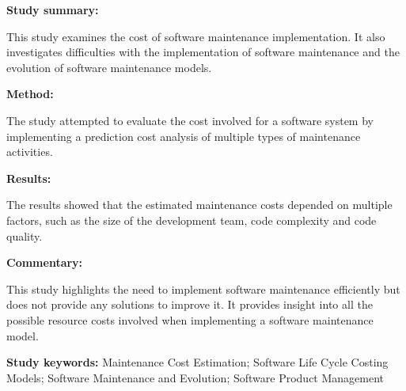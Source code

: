 \begin{tcolorbox}[colback=gray!5!white, colframe=pastelgreen!40!black, title=A cost model for software maintenance \& evolution\cite{Sneed2004}]
	\begin{minipage}[t]{0.25\textwidth}
		\textbf{Study summary:}
	\end{minipage}
	\hfill
	\begin{minipage}[t]{0.65\textwidth}
		This study examines the cost of software maintenance implementation. It also investigates difficulties with the implementation of software maintenance and the evolution of software maintenance models. 
	\end{minipage}

	\vspace{0.75em} 

	\begin{minipage}[t]{0.25\textwidth}
		\textbf{Method:}
	\end{minipage}
	\hfill
	\begin{minipage}[t]{0.65\textwidth}
		The study attempted to evaluate the cost involved for a software system by implementing a prediction cost analysis of multiple types of maintenance activities.
	\end{minipage}

	\vspace{0.75em} 

	\begin{minipage}[t]{0.25\textwidth}
		\textbf{Results:}
	\end{minipage}
	\hfill
	\begin{minipage}[t]{0.65\textwidth}
		The results showed that the estimated maintenance costs depended on multiple factors, such as the size of the development team, code complexity and code quality.
	\end{minipage}

	\vspace{0.75em} 

	\begin{minipage}[t]{0.25\textwidth}
		\textbf{Commentary:}
	\end{minipage}
	\hfill
	\begin{minipage}[t]{0.65\textwidth}
		This study highlights the need to implement software maintenance efficiently but does not provide any solutions to improve it. It provides insight into all the possible resource costs involved when implementing a software maintenance model.
	\end{minipage}
	\tcblower
	\textbf{Study keywords:} Maintenance Cost Estimation; Software Life Cycle Costing Models;
	Software Maintenance and Evolution; Software Product Management
\end{tcolorbox}


